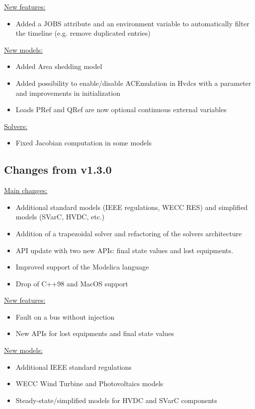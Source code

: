\documentclass[a4paper, 12pt]{report}
\begin{document}
\underline{New features:}
\begin{itemize}
\item Added a JOBS attribute and an environment variable to automatically filter the timeline (e.g. remove duplicated entries)
\end{itemize}

\underline{New models:}
\begin{itemize}
\item Added Area shedding model
\item Added possibility to enable/disable ACEmulation in Hvdcs with a parameter and improvements in initialization
\item Loads PRef and QRef are now optional continuous external variables
\end{itemize}

\underline{Solvers:}
\begin{itemize}
\item Fixed Jacobian computation in some models
\end{itemize}

\subsection{Changes from v1.3.0}

\underline{Main changes:}
\begin{itemize}
\item Additional standard models (IEEE regulations, WECC RES) and simplified models (SVarC, HVDC, etc.)
\item Addition of a trapezoidal solver and refactoring of the solvers architecture
\item API update with two new APIs: final state values and lost equipments.
\item Improved support of the Modelica language
\item Drop of C++98 and MacOS support
\end{itemize}

\underline{New features:}
\begin{itemize}
\item Fault on a bus without injection
\item New APIs for lost equipments and final state values
\end{itemize}

\underline{New models:}
\begin{itemize}
\item Additional IEEE standard regulations
\item WECC Wind Turbine and Photovoltaics models
\item Steady-state/simplified models for HVDC and SVarC components
\end{itemize}
\end{document}
